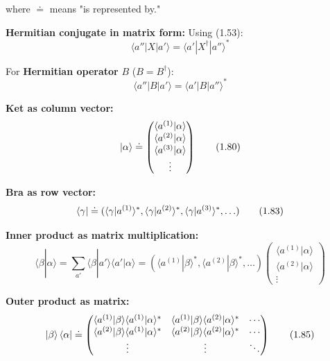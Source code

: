 \documentclass[11pt,a4paper]{article}
\begin{document}
where $\doteq$ means "is represented by."

\textbf{Hermitian conjugate in matrix form:}
Using (1.53):
\begin{equation}
\langle a''|X|a'\rangle = \langle a'|X^\dagger|a''\rangle^*
\tag{1.74}
\end{equation}

For \textbf{Hermitian operator} $B$ ($B = B^\dagger$):
\begin{equation}
\langle a''|B|a'\rangle = \langle a'|B|a''\rangle^*
\tag{1.75}
\end{equation}

\textbf{Ket as column vector:}
\begin{equation}
\ket{\alpha} \doteq \begin{pmatrix}
\langle a^{(1)}|\alpha\rangle \\
\langle a^{(2)}|\alpha\rangle \\
\langle a^{(3)}|\alpha\rangle \\
\vdots
\end{pmatrix}
\tag{1.80}
\end{equation}

\textbf{Bra as row vector:}
\begin{equation}
\bra{\gamma} \doteq (\langle\gamma|a^{(1)}\rangle^*, \langle\gamma|a^{(2)}\rangle^*, \langle\gamma|a^{(3)}\rangle^*, \ldots)
\tag{1.83}
\end{equation}

\textbf{Inner product as matrix multiplication:}
\begin{equation}
\langle\beta|\alpha\rangle = \sum_{a'}\langle\beta|a'\rangle\langle a'|\alpha\rangle = (\langle a^{(1)}|\beta\rangle^*, \langle a^{(2)}|\beta\rangle^*, \ldots) \begin{pmatrix}
\langle a^{(1)}|\alpha\rangle \\
\langle a^{(2)}|\alpha\rangle \\
\vdots
\end{pmatrix}
\tag{1.84}
\end{equation}

\textbf{Outer product as matrix:}
\begin{equation}
\ket{\beta}\bra{\alpha} \doteq \begin{pmatrix}
\langle a^{(1)}|\beta\rangle\langle a^{(1)}|\alpha\rangle^* & \langle a^{(1)}|\beta\rangle\langle a^{(2)}|\alpha\rangle^* & \cdots \\
\langle a^{(2)}|\beta\rangle\langle a^{(1)}|\alpha\rangle^* & \langle a^{(2)}|\beta\rangle\langle a^{(2)}|\alpha\rangle^* & \cdots \\
\vdots & \vdots & \ddots
\end{pmatrix}
\tag{1.85}
\end{equation}
\end{document}
